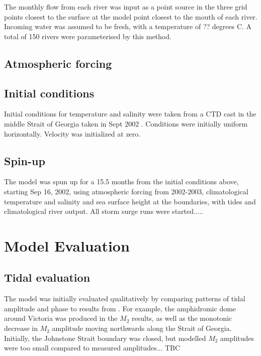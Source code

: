 \documentclass[pdftex,12pt]{article}
\begin{document}
The monthly flow from each river was input as a point source in the three grid points closest to the surface at the model point closest to the mouth of each river. Incoming water was assumed to be fresh, with a temperature of ?? degrees C. A total of 150 rivers were parameterised by this method. 


\subsection{Atmospheric forcing}

\subsection{Initial conditions}
Initial conditions for temperature and salinity were taken from a CTD cast in the middle Strait of Georgia taken in Sept 2002 \citep{pawlowiczetal2007}.  Conditions were initially uniform horizontally.  Velocity was initialized at zero.

\subsection{Spin-up}
The model was spun up for a 15.5 months from the initial conditions above, starting Sep 16, 2002, using atmospheric forcing from 2002-2003, climatological temperature and salinity and sea surface height at the boundaries, with tides and climatological river output.  All storm surge runs were started.....

\section{Model Evaluation}\label{sec:model}

\subsection{Tidal evaluation}
The model was initially evaluated qualitatively by comparing patterns of tidal amplitude and phase to results from \citep{foreman1995tidal}. For example, the amphidromic dome around Victoria was produced in the $M_2$ results, as well as the monotonic decrease in $M_2$ amplitude moving northwards along the Strait of Georgia. Initially, the Johnstone Strait boundary was closed, but modelled $M_2$ amplitudes were too small compared to measured amplitudes... TBC
\end{document}
